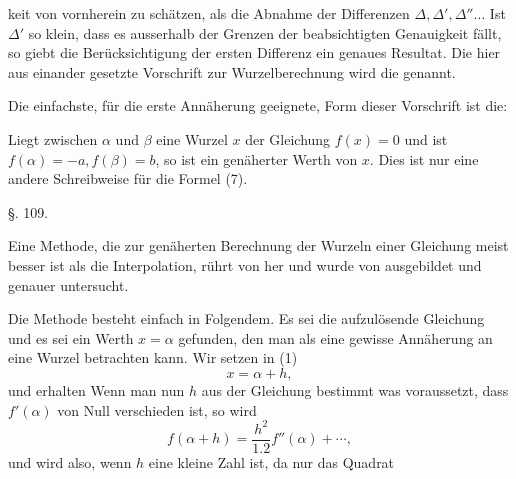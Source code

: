 keit von vornherein zu schätzen, als die Abnahme der Differenzen
$\varDelta, \varDelta', \varDelta''\ldots$ Ist $\varDelta'$ so klein,
dass es ausserhalb der Grenzen der beabsichtigten Genauigkeit fällt, so
giebt die Berücksichtigung der ersten Differenz ein genaues Resultat.
Die hier aus einander gesetzte Vorschrift zur Wurzelberechnung wird die
 genannt.

Die einfachste, für die erste Annäherung geeignete, Form dieser
Vorschrift ist die:

Liegt zwischen $\alpha$ und $\beta$ eine Wurzel $x$ der Gleichung
$f(x)=0$ und ist $f(\alpha) = -a, f(\beta) = b$, so ist
ein genäherter Werth von $x$. Dies ist nur eine andere Schreibweise für
die Formel (7).

\begin{center}
§. 109.\\
\end{center}

Eine Methode, die zur genäherten Berechnung der Wurzeln einer Gleichung
meist besser ist als die Interpolation, rührt von  her
und wurde von  ausgebildet und genauer untersucht.

Die Methode besteht einfach in Folgendem. Es sei
die aufzulösende Gleichung und es sei ein Werth $x = \alpha$ gefunden,
den man als eine gewisse Annäherung an eine Wurzel betrachten kann. Wir
setzen in (1)
\[ x = \alpha + h, \]
und erhalten
Wenn man nun $h$ aus der Gleichung bestimmt
was voraussetzt, dass $f'(\alpha)$ von Null verschieden ist, so wird
\[ f(\alpha+h) = \frac{h^2}{1.2}f''(\alpha) + \cdots, \]
und wird also, wenn $h$ eine kleine Zahl ist, da nur das Quadrat
